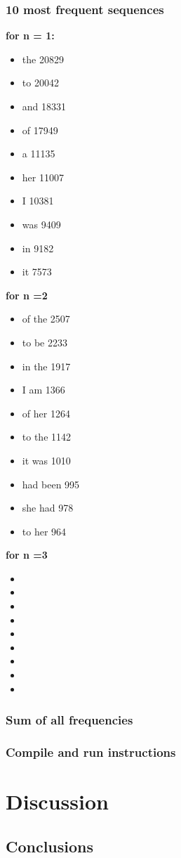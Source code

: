 \documentclass[final,12pt]{elsarticle}
\begin{document}
\subsubsection{10 most frequent sequences}
\textbf{for n = 1:}
\begin{itemize}
\item the 20829
\item to 20042
\item and 18331 
\item of 17949
\item a 11135
\item her 11007
\item I 10381
\item was 9409
\item in 9182 
\item it 7573
\end{itemize}
\textbf{for n =2}
\begin{itemize}
\item of the 2507
\item to be 2233
\item in the 1917
\item I am 1366
\item of her 1264
\item to the 1142
\item it was 1010
\item had been 995
\item she had 978
\item to her 964
\end{itemize}
\textbf{for n =3}
\begin{itemize}
\item 
\item
\item
\item
\item
\item
\item
\item
\item
\end{itemize}
\subsubsection{Sum of all frequencies}
\subsubsection{Compile and run instructions}
\section{Discussion}
\subsection{Conclusions}
\end{document}
